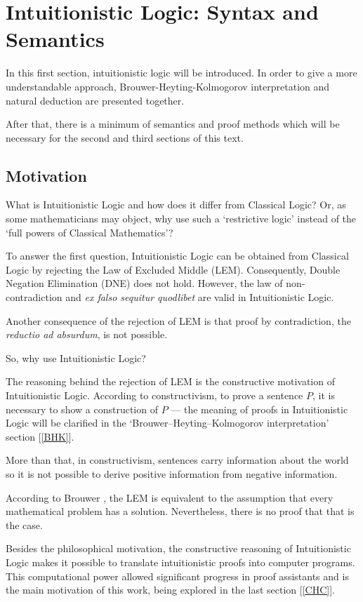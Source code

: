 \documentclass[12pt,a4paper]{article}
\theoremstyle{definition}
\begin{document}
\newpage
\section{Intuitionistic Logic: Syntax and Semantics}
\label{Logic}

In this first section, intuitionistic logic will be introduced. In order to give a more understandable approach, Brouwer-Heyting-Kolmogorov interpretation and natural deduction are presented together.

After that, there is a minimum of semantics and proof methods which will be necessary for the second and third sections of this text.

\subsection{Motivation}
\label{Motivation}

What is Intuitionistic Logic and how does it differ from Classical Logic? Or, as some mathematicians may object, why use such a `restrictive logic' instead of the `full powers of Classical Mathematics'?

To answer the first question, Intuitionistic Logic can be obtained from Classical Logic by rejecting the Law of Excluded Middle (LEM). Consequently, Double Negation Elimination (DNE) does not hold. However, the law of non-contradiction and \textit{ex falso sequitur quodlibet} are valid in Intuitionistic Logic.

Another consequence of the rejection of LEM is that proof by contradiction, the \textit{reductio ad absurdum}, is not possible.

So, why use Intuitionistic Logic?

The reasoning behind the rejection of LEM is the constructive motivation of Intuitionistic Logic. According to constructivism, to prove a sentence $P$, it is necessary to show a construction of $P$ --- the meaning of proofs in Intuitionistic Logic will be clarified in the `Brouwer–Heyting–Kolmogorov interpretation' section [\ref{BHK}].

More than that, in constructivism, sentences carry information about the world so it is not possible to derive positive information from negative information.

According to Brouwer \cite{van2017lej}, the LEM is equivalent to the assumption that every mathematical problem has a solution. Nevertheless, there is no proof that that is the case.

Besides the philosophical motivation, the constructive reasoning of Intuitionistic Logic makes it possible to translate intuitionistic proofs into computer programs. This computational power allowed significant progress in proof assistants and is the main motivation of this work, being explored in the last section [\ref{CHC}].
\end{document}
